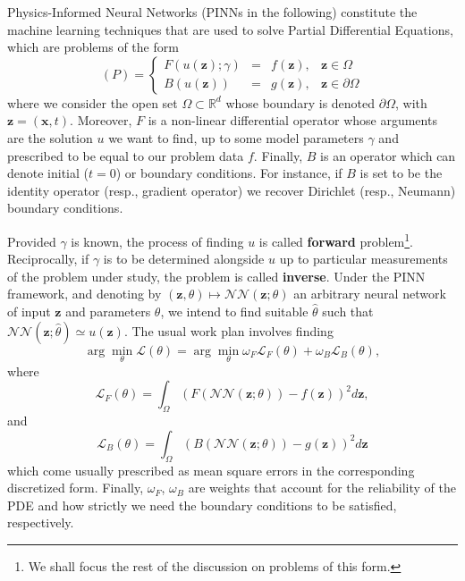 \documentclass[12pt]{report} %
\newcommand{\tmmathbf}[1]{\ensuremath{\boldsymbol{#1}}}
\newcommand{\tmstrong}[1]{\textbf{#1}}
\begin{document}
Physics-Informed Neural Networks (PINNs in the following) constitute the
machine learning techniques that are used to solve Partial Differential
Equations, which are problems of the form
\begin{equation}
  (P) = \left\{\begin{array}{rlll}
    F (u (\tmmathbf{z}) ; \gamma) & = & f (\tmmathbf{z}), & \tmmathbf{z} \in
    \Omega\\
    B (u (\tmmathbf{z})) & = & g (\tmmathbf{z}), & \tmmathbf{z} \in \partial
    \Omega
  \end{array}\right. \label{pdegeneralform}
\end{equation}
where we consider the open set $\Omega \subset \mathbb{R}^d$ whose boundary is
denoted $\partial \Omega$, with $\tmmathbf{z}= (\tmmathbf{x}, t)$. Moreover,
$F$ is a non-linear differential operator whose arguments are the solution $u$
we want to find, up to some model parameters $\gamma$ and prescribed to be
equal to our problem data $f$. Finally, $B$ is an operator which can denote
initial ($t = 0$) or boundary conditions. For instance, if $B$ is set to be
the identity operator (resp., gradient operator) we recover Dirichlet (resp.,
Neumann) boundary conditions.

Provided $\gamma$ is known, the process of finding $u$ is called
{\tmstrong{forward}} problem\footnote{We shall focus the rest of the
discussion on problems of this form.}. Reciprocally, if $\gamma$ is to be
determined alongside $u$ up to particular measurements of the problem under study, the problem is called {\tmstrong{inverse}}. Under
the PINN framework, and denoting by $(\tmmathbf{z}, \theta) \mapsto
\mathcal{N}\mathcal{N} (\tmmathbf{z}; \theta)$ an arbitrary neural network of input $\tmmathbf{z}$ and 
parameters $\theta$, we intend to find suitable $\hat{ \theta}$ such that
$\mathcal{N}\mathcal{N} (\tmmathbf{z}; \hat{ \theta}) \simeq u (\tmmathbf{z})$. The
usual work plan involves finding
\begin{equation}
   \arg \min_{\theta} \mathcal{L} (\theta) = \arg \min_{\theta} \omega_F
   \mathcal{L}_F (\theta) + \omega_B \mathcal{L}_B (\theta), 
   \label{loss-fun-pinn}
\end{equation}
where
\begin{equation}
   \mathcal{L}_F (\theta) = \int_{\Omega} (F (\mathcal{N}\mathcal{N}
   (\tmmathbf{z}; \theta)) - f (\tmmathbf{z}))^2 d\tmmathbf{z}, 
   \label{loss-F}
\end{equation}
and
\begin{equation}
    \mathcal{L}_B (\theta) = \int_{\Omega} (B (\mathcal{N}\mathcal{N}
   (\tmmathbf{z}; \theta)) - g (\tmmathbf{z}))^2 d\tmmathbf{z}
   \label{loss-boundary}
\end{equation}
which come usually prescribed as mean square errors in the corresponding
discretized form. Finally, $\omega_F$, $\omega_B$ are weights that account for the
reliability of the PDE and how strictly we need the boundary conditions to be
satisfied, respectively.
\end{document}
